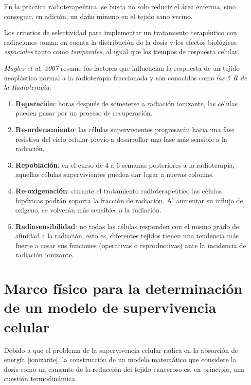 \documentclass[12pt,letterpaper, oneside]{book}
\begin{document}
			En la práctica radioterapeútica, se busca no solo reducir el área enferma, sino conseguir, en adición, un daño mínimo en el tejido sano vecino\cite{Mayles.2007}. 
			
			Los criterios de selectividad para implementar un tratamiento terapéutico con radiaciones toman en cuenta la distribución de la dosis y los efectos biológicos \textit{espaciales} tanto como \textit{temporales}, al igual que los tiempos de respuesta celular\cite{Mayles.2007}.
			
			\textit{Mayles et al, 2007} resume los factores que influencian la respuesta de un tejido neoplástico normal a la radioterapia fraccionada y son conocidos como \textit{las 5 R de la Radioterapia}:
			
			\begin{enumerate}
				\item \textbf{Reparación}: horas después de someterse a radiación ionizante, las células pueden pasar por un proceso de recuperación. 
				\item \textbf{Re-ordenamiento}: las células supervivientes progresarán hacia una fase resistiva del ciclo celular previo a desarrollar una fase más sensible a la radiación. 
				\item \textbf{Repoblación}: en el curso de 4 a 6 semanas posteriores a la radioterapia, aquellas células supervivientes pueden dar lugar a nuevas colonias. 
				\item \textbf{Re-oxigenación}: durante el tratamiento radioterapeútico las células hipóxicas podrán soporta la fracción de radiación. Al aumentar su influjo de oxígeno, se volverán más sensibles a la radiación. 
				\item \textbf{Radiosensibilidad}: no todas las células responden con el mismo grado de afinidad a la radiación, esto es, diferentes tejidos tienen una tendencia más fuerte a cesar sus funciones (operativas o reproductivas) ante la incidencia de radiación ionizante. 
			\end{enumerate}
	
	
	\chapter{Marco físico para la determinación de un modelo de supervivencia celular}
	Debido a que el problema de la supervivencia celular radica en la absorción de energía [ionizante], la construcción de un modelo matemático que considere la dosis como un causante de la reducción del tejido canceroso es, en principio, una cuestión termodinámica. 
	
\end{document}
